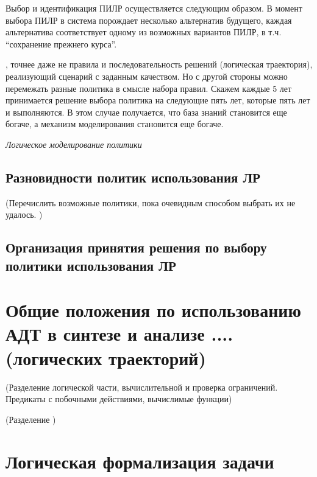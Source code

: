 Выбор и идентификация ПИЛР осуществляется следующим образом. В момент выбора ПИЛР в система порождает несколько альтернатив будущего, каждая альтернатива соответствует одному из возможных вариантов ПИЛР, в т.ч. ``сохранение прежнего курса''.



, точнее даже не правила и последовательность решений (логическая траектория), реализующий сценарий с заданным качеством. Но с другой стороны можно перемежать разные политика в смысле набора правил. Скажем каждые 5 лет принимается решение выбора политика на следующие пять лет, которые пять лет и выполняются. В этом случае получается, что база знаний становится еще богаче, а механизм моделирования становится еще богаче.

\emph{Логическое моделирование политики}

\subsection{Разновидности политик использования ЛР}
(Перечислить возможные политики, пока очевидным способом выбрать их не удалось. )

\subsection{Организация принятия решения по выбору политики использования ЛР}

\section{Общие положения по использованию АДТ в синтезе и анализе .... (логических траекторий)}


(Разделение логической части, вычислительной и проверка ограничений. Предикаты с побочными действиями, вычислимые функции)

(Разделение )

\section{Логическая формализация задачи}

